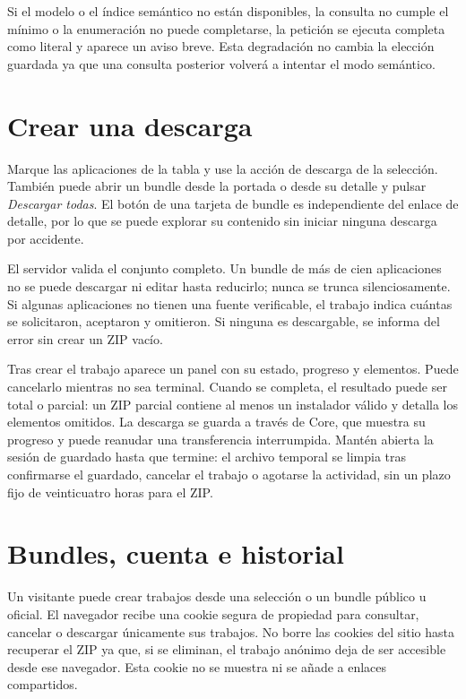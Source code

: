 Si el modelo o el índice semántico no están disponibles, la consulta no cumple el mínimo o la enumeración no puede completarse, la petición se ejecuta completa como literal y aparece un aviso breve. Esta degradación no cambia la elección guardada ya que una consulta posterior volverá a intentar el modo semántico.

\section{Crear una descarga}

Marque las aplicaciones de la tabla y use la acción de descarga de la selección. También puede abrir un bundle desde la portada o desde su detalle y pulsar \emph{Descargar todas}. El botón de una tarjeta de bundle es independiente del enlace de detalle, por lo que se puede explorar su contenido sin iniciar ninguna descarga por accidente.

El servidor valida el conjunto completo. Un bundle de más de cien aplicaciones no se puede descargar ni editar hasta reducirlo; nunca se trunca silenciosamente. Si algunas aplicaciones no tienen una fuente verificable, el trabajo indica cuántas se solicitaron, aceptaron y omitieron. Si ninguna es descargable, se informa del error sin crear un ZIP vacío.

Tras crear el trabajo aparece un panel con su estado, progreso y elementos. Puede cancelarlo mientras no sea terminal. Cuando se completa, el resultado puede ser total o parcial: un ZIP parcial contiene al menos un instalador válido y detalla los elementos omitidos. La descarga se guarda a través de Core, que muestra su progreso y puede reanudar una transferencia interrumpida. Mantén abierta la sesión de guardado hasta que termine: el archivo temporal se limpia tras confirmarse el guardado, cancelar el trabajo o agotarse la actividad, sin un plazo fijo de veinticuatro horas para el ZIP.

\section{Bundles, cuenta e historial}

Un visitante puede crear trabajos desde una selección o un bundle público u oficial. El navegador recibe una cookie segura de propiedad para consultar, cancelar o descargar únicamente sus trabajos. No borre las cookies del sitio hasta recuperar el ZIP ya que, si se eliminan, el trabajo anónimo deja de ser accesible desde ese navegador. Esta cookie no se muestra ni se añade a enlaces compartidos.

